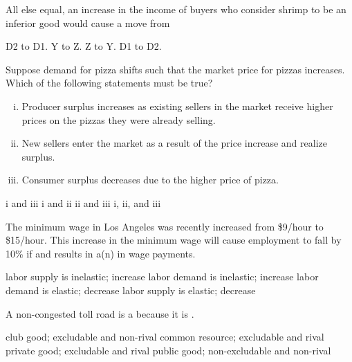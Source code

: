 \documentclass[addpoints,11pt]{exam}
\theoremstyle{definition}
\newcommand{\blank}[0]{\underline{\hspace{3cm}}}
\begin{document}
\begin{questions}
	All else equal, an increase in the income of buyers who consider shrimp to be an inferior good would cause a move from
		
		\begin{choices}
			\choice D2 to D1.
			\choice Y to Z.
			\choice Z to Y.
			\CorrectChoice D1 to D2.
		\end{choices}
		


	\question Suppose demand for pizza shifts such that the market price for pizzas increases. Which of the following statements must be true?
	
		\begin{enumerate}[i.]
			\item Producer surplus increases as existing sellers in the market receive higher prices on the pizzas they were already selling.
			\item New sellers enter the market as a result of the price increase and realize surplus.
			\item Consumer surplus decreases due to the higher price of pizza.
		\end{enumerate}
		
		\begin{choices}
			\choice i and iii
			\CorrectChoice i and ii
			\choice ii and iii
			\choice i, ii, and iii
		\end{choices}

	
	\question The minimum wage in Los Angeles was recently increased from \$9/hour to \$15/hour. This increase in the minimum wage will cause employment to fall by 10\% if \underline{\hspace{3cm}} and results in a(n) \underline{\hspace{3cm}} in wage payments.
	
	\begin{choices}
			\choice labor supply is inelastic; increase
			\CorrectChoice labor demand is inelastic; increase
			\choice labor demand is elastic; decrease
			\choice labor supply is elastic; decrease
	\end{choices}
	
\newpage
	
	\question A non-congested toll road is a \blank because it is \blank.
	
	\begin{choices}
			\CorrectChoice club good; excludable and non-rival
			\choice common resource; excludable and rival
			\choice private good; excludable and rival
			\choice public good; non-excludable and non-rival
	\end{choices}


\end{questions}
\end{document}
